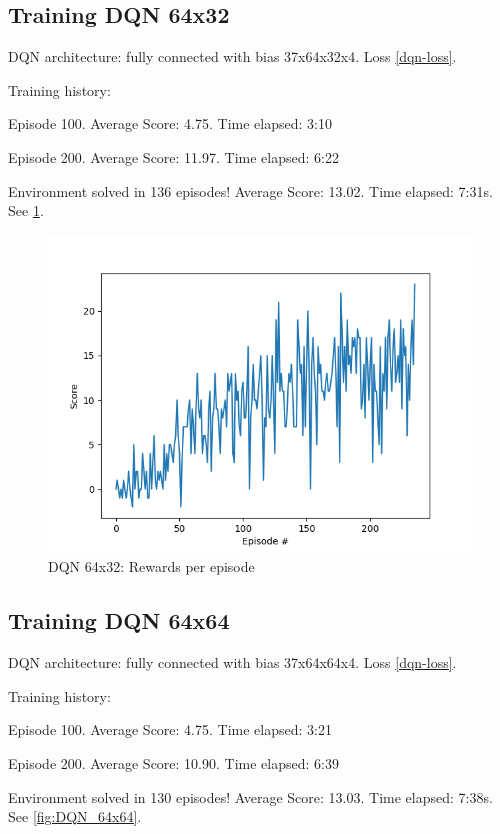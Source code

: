 \documentclass{report}
\begin{document}
\subsection*{Training DQN 64x32}

DQN architecture: fully connected with bias 37x64x32x4. Loss \ref{dqn-loss}.

Training history:

Episode 100.	Average Score: 4.75.	Time elapsed: 3:10

Episode 200.	Average Score: 11.97.	Time elapsed: 6:22

Environment solved in 136 episodes!	Average Score: 13.02. Time elapsed: 7:31s. See \ref{fig:DQN_64x32}.

\begin{figure}
\includegraphics[width=0.9\linewidth]{res/DQN_64x32/score.png}
\caption{DQN 64x32: Rewards per episode}
\label{fig:DQN_64x32}
\end{figure}


\subsection*{Training DQN 64x64}

DQN architecture: fully connected with bias 37x64x64x4. Loss \ref{dqn-loss}.

Training history:

Episode 100.	Average Score: 4.75.	Time elapsed: 3:21

Episode 200.	Average Score: 10.90.	Time elapsed: 6:39

Environment solved in 130 episodes!	Average Score: 13.03. Time elapsed: 7:38s. See \ref{fig:DQN_64x64}.
\end{document}

